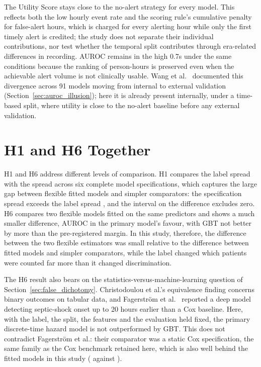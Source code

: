 The Utility Score stays close to the no-alert strategy for every model. This
reflects both the low hourly event rate and the scoring rule's cumulative
penalty for false-alert hours, which is charged for every alerting hour while
only the first timely alert is credited; the study does not separate their
individual contributions, nor test whether the temporal split contributes
through era-related differences in recording. AUROC remains in the high 0.7s
under the same conditions because the ranking of person-hours is preserved
even when the achievable alert volume is not clinically usable. Wang et al.\
\cite{wang2025srpm} documented this divergence across 91 models moving from
internal to external validation (Section~\ref{sec:auroc_illusion}); here it is
already present internally, under a time-based split, where utility is close
to the no-alert baseline before any external validation.


\section{H1 and H6 Together}
\label{sec:discussion_h1h6}

H1 and H6 address different levels of comparison. H1 compares the label spread
with the spread across six complete model specifications, which captures the
large gap between flexible fitted models and simpler comparators: the
specification spread \pcSpreadModelClass{} exceeds the label spread
\pcSpreadLabel{}, and the interval on the difference excludes zero. H6
compares two flexible models fitted on the same predictors and shows a much
smaller difference, \pcHSixAbsEst{} AUROC in the primary model's favour, with
GBT not better by more than the pre-registered margin. In this study,
therefore, the difference between the two flexible estimators was small
relative to the difference between fitted models and simpler comparators,
while the label changed which patients were counted far more than it changed
discrimination.

The H6 result also bears on the statistics-versus-machine-learning question of
Section~\ref{sec:false_dichotomy}. Christodoulou et al.'s
\cite{christodoulou2019cox} equivalence finding concerns binary outcomes on
tabular data, and Fagerstr{\"o}m et al.\ \cite{fagerstrom2019lisep} reported a
deep model detecting septic-shock onset up to 20 hours earlier than a Cox
baseline. Here, with the label, the split, the features and the evaluation
held fixed, the primary discrete-time hazard model is not outperformed by
GBT. This does not contradict Fagerstr{\"o}m et al.: their comparator was a
static Cox specification, the same family as the Cox benchmark retained here,
which is also well behind the fitted models in this study (\pcAurocCoxB{}
against \pcAurocPrimaryB).

